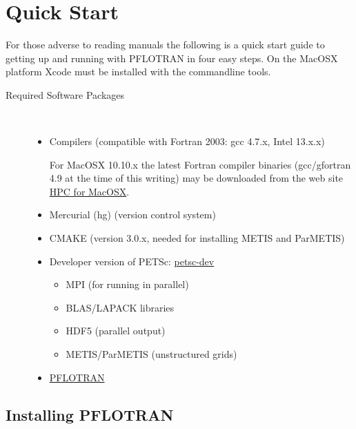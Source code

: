 \section{Quick Start}

For those adverse to reading manuals the following is a quick start guide to getting up and running with PFLOTRAN in four easy steps. On the MacOSX platform Xcode must be installed with the commandline tools.

\begin{description}
\item[Required Software Packages] ~
\begin{itemize}
\item Compilers (compatible with Fortran 2003: gcc 4.7.x, Intel 13.x.x)

For MacOSX 10.10.x the latest Fortran compiler binaries (gcc/gfortran 4.9 at the time of this writing) may be downloaded from the web site \href{http://hpc.sourceforge.net}{HPC for MacOSX}.


\item Mercurial (hg) (version control system)
\item CMAKE (version 3.0.x, needed for installing METIS and ParMETIS)
\item Developer version of PETSc: \href{http://www.mcs.anl.gov/petsc/developers/index.html}{petsc-dev}
\begin{itemize}
\item MPI (for running in parallel)
\item BLAS/LAPACK libraries
\item HDF5 (parallel output)
\item METIS/ParMETIS (unstructured grids)
\end{itemize}
\item \href{https://bitbucket.org/pflotran/pflotran-dev}{PFLOTRAN}
\end{itemize}
\end{description}

\subsection{Installing PFLOTRAN}

